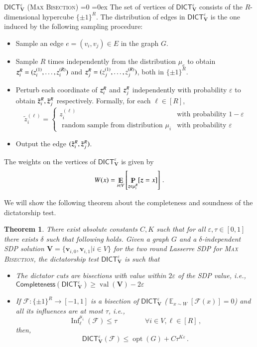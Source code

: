\documentclass[11pt]{article}
\def\full{1}
\newtheorem{theorem}{Theorem}[section]
\theoremstyle{definition}
\newenvironment{mybox}
{\center \noindent\begin{boxedminipage}{1.0\linewidth}}
{\end{boxedminipage}
\noindent
}
\newcommand{\Esymb}{\mathbb{E}}
\newcommand{\Psymb}{\mathbb{P}}
\DeclareMathOperator*{\E}{\Esymb}
\DeclareMathOperator*{\ProbOp}{\Psymb}
\renewcommand{\Pr}{\ProbOp}
\newcommand{\sbits}{\{\pm1\}}
\renewcommand{\vec}[1]{{\bm{#1}}}
\newcommand{\mper}{\,.}
\newcommand{\mcom}{\,,}
\DeclareMathOperator{\Inf}{Inf}
\DeclareMathOperator{\val}{val}
\DeclareMathOperator{\opt}{opt}
\newcommand{\problemmacro}[1]{\texorpdfstring{\textsc{#1}}{#1}\xspace}
\newcommand{\maxbisection}{\problemmacro{Max Bisection}}
\newcommand{\cF}{\mathcal F}
\renewcommand{\leq}{\leqslant}
\renewcommand{\geq}{\geqslant}
\let\epsilon=\varepsilon
\numberwithin{equation}{section}
\newcommand{\eps}{\epsilon}
\newcommand{\dict} {\textsf{DICT}}
\newcommand{\mrv}[1]{\bm{\lowercase{#1}}}
\newcommand{\msf}[1]{\mathsf{#1}}
\begin{document}
	\begin{mybox}
$\dict^{\eps}_{\vec{V}}$ (\maxbisection)
\ifnum\full=0
\itemsep=0ex
\fi
The set of vertices of $\dict^{\eps}_{\vec V}$ consists of the
$R$-dimensional hypercube $\sbits^{R}$.  The distribution of edges in
$\dict^{\eps}_{\vec V}$ is the one induced by the following sampling
procedure:
\begin{itemize} \itemsep=0ex
\item Sample an edge $e = (v_i,v_j) \in E$ in the graph $G$.
\item Sample $R$ times independently from the distribution $\mu_{e}$ to
	obtain $\mrv{z}_i^R = (z_i^{(1)},\ldots, z_{i}^{(R)})$ and
	$\mrv{z}^R_j = (z_j^{(1)},\ldots, z_{j}^{(R)})$, both in
	$\sbits^{R}$.
\item  Perturb each coordinate of $\mrv{z}^R_i$ and $\mrv{z}^R_j$
	independently with probability $\epsilon$ to obtain
	$\tilde{\mrv{z}}^R_i,\tilde{\mrv{z}}^R_j$
	respectively.  Formally, for each $\ell \in [R]$,
	$$ \tilde{z}_i^{(\ell)} = \begin{cases} z_{i}^{(\ell)} & \text{
		with probability } 1-\eps \\
		\text{ random sample from distribution } \mu_i  & \text{
		with probability } \eps
	\end{cases} $$
\item Output the edge $(\tilde{\mrv{z}}^{R}_i,
	\tilde{\mrv{z}}^{R}_j)$. \end{itemize}
The weights on the vertices of $\dict^{\eps}_{\vec V}$ is given by
$$ W(x) = \E_{i \in V}\left[ \Pr_{\mrv{z} \in \mu_i^R}[\mrv{z} =
x]\right] \mper $$
\end{mybox}

  We will show the following theorem about the completeness and
soundness of the dictatorship test.

\begin{theorem} \label{thm:gaptodict}
There exist absolute constants $C,K$ such that for all $\eps, \tau
\in [0,1]$ there exists $\delta$ such that following holds. Given a graph $G$ and a
$\delta$-independent SDP solution $\vec V = \{\vec
v_{i,0}, \vec v_{i,1}|i \in V\}$  for the two round Lasserre SDP for \maxbisection, the
dictatorship test $\dict_{\vec V}^{\eps}$ is such that
\begin{itemize}
	\item The {\it dictator cuts} are bisections with value within
		$2\epsilon$ of the SDP value, i.e.,
		$\msf{Completeness}(\dict^{\eps}_{\vec V}) \geq \val(\vec V) -
		2\eps$
	\item If $\cF: \sbits^R \to [-1,1]$ is a bisection of
		$\dict_{\vec V}^{\eps}$ ($\E_{x \sim W}[\cF(x)]
		= 0$) and all its influences are at most $\tau$, i.e.,
		$$\Inf_\ell^{\mu_i}(\cF) \leq \tau \qquad\qquad
		\forall i \in V, \ell \in [R]\mcom$$ then,
		$$ \dict_{\vec V}^{\eps}(\cF) \leq \opt(G)+
		C\tau^{K\eps} \mper $$
\end{itemize}
\end{theorem}
\end{document}
